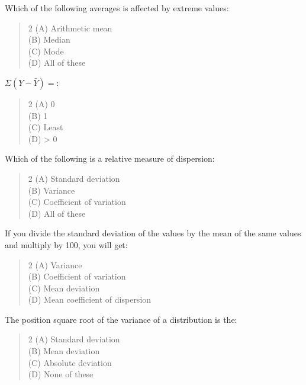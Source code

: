 \documentclass[11pt,a4paper]{article}
\begin{document}
\begin{mcqlist}
\item Which of the following averages is affected by extreme values:
\begin{quote}\begin{multicols}{2}
\noindent (A) Arithmetic mean \\
(B) Median \\
(C) Mode \\
(D) All of these
\end{multicols}\end{quote}

\item $\Sigma (Y - \bar{Y}) = $:
\begin{quote}\begin{multicols}{2}
\noindent (A) 0 \\
(B) 1 \\
(C) Least \\
(D) > 0
\end{multicols}\end{quote}

\item Which of the following is a relative measure of dispersion:
\begin{quote}\begin{multicols}{2}
\noindent (A) Standard deviation \\
(B) Variance \\
(C) Coefficient of variation \\
(D) All of these
\end{multicols}\end{quote}

\item If you divide the standard deviation of the values by the mean of the same values and multiply by 100, you will get:
\begin{quote}\begin{multicols}{2}
\noindent (A) Variance \\
(B) Coefficient of variation \\
(C) Mean deviation \\
(D) Mean coefficient of dispersion
\end{multicols}\end{quote}

\item The position square root of the variance of a distribution is the:
\begin{quote}\begin{multicols}{2}
\noindent (A) Standard deviation \\
(B) Mean deviation \\
(C) Absolute deviation \\
(D) None of these
\end{multicols}\end{quote}


\end{mcqlist}
\end{document}
